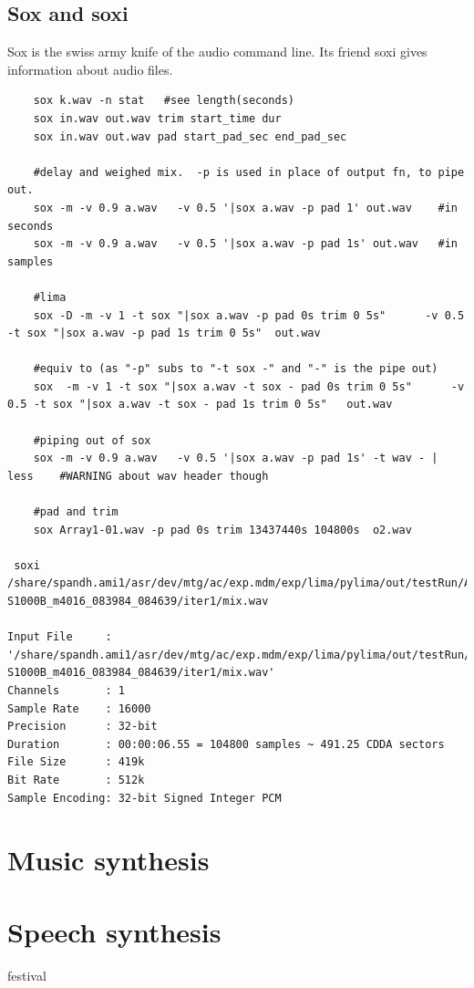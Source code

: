 \documentclass[oneside,english]{scrbook}
\begin{document}
\section{Sox and soxi}
Sox is the swiss army knife of the audio command line. Its friend soxi gives information about audio files.
\begin{lstlisting}
	sox k.wav -n stat   #see length(seconds)
	sox in.wav out.wav trim start_time dur			
	sox in.wav out.wav pad start_pad_sec end_pad_sec

	#delay and weighed mix.  -p is used in place of output fn, to pipe out.
	sox -m -v 0.9 a.wav   -v 0.5 '|sox a.wav -p pad 1' out.wav    #in seconds
	sox -m -v 0.9 a.wav   -v 0.5 '|sox a.wav -p pad 1s' out.wav   #in samples

	#lima
	sox -D -m -v 1 -t sox "|sox a.wav -p pad 0s trim 0 5s"      -v 0.5 -t sox "|sox a.wav -p pad 1s trim 0 5s"  out.wav
 
	#equiv to (as "-p" subs to "-t sox -" and "-" is the pipe out)
	sox  -m -v 1 -t sox "|sox a.wav -t sox - pad 0s trim 0 5s"      -v 0.5 -t sox "|sox a.wav -t sox - pad 1s trim 0 5s"   out.wav
	
	#piping out of sox
	sox -m -v 0.9 a.wav   -v 0.5 '|sox a.wav -p pad 1s' -t wav - | less    #WARNING about wav header though

	#pad and trim
	sox Array1-01.wav -p pad 0s trim 13437440s 104800s  o2.wav

 soxi  /share/spandh.ami1/asr/dev/mtg/ac/exp.mdm/exp/lima/pylima/out/testRun/AMI-S1000B_m4016_083984_084639/iter1/mix.wav

Input File     : '/share/spandh.ami1/asr/dev/mtg/ac/exp.mdm/exp/lima/pylima/out/testRun/AMI-S1000B_m4016_083984_084639/iter1/mix.wav'
Channels       : 1
Sample Rate    : 16000
Precision      : 32-bit
Duration       : 00:00:06.55 = 104800 samples ~ 491.25 CDDA sectors
File Size      : 419k
Bit Rate       : 512k
Sample Encoding: 32-bit Signed Integer PCM

\end{lstlisting}


\chapter{Music synthesis}


\chapter{Speech synthesis}

festival
\end{document}
